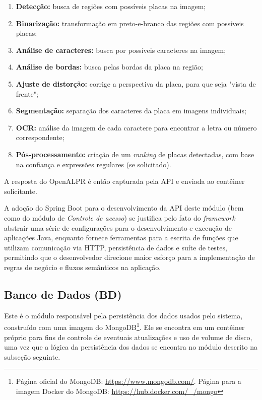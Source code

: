 \documentclass[12pt]{article}
\begin{document}
\begin{enumerate}
	\item \textbf{Detecção:} busca de regiões com possíveis placas na imagem;
	\item \textbf{Binarização:} transformação em preto-e-branco das regiões com possíveis placas;
	\item \textbf{Análise de caracteres:} busca por possíveis caracteres na imagem;
	\item \textbf{Análise de bordas:} busca pelas bordas da placa na região;
	\item \textbf{Ajuste de distorção:} corrige a perspectiva da placa, para que seja "vista de frente";
	\item \textbf{Segmentação:} separação dos caracteres da placa em imagens individuais;
	\item \textbf{OCR:} análise da imagem de cada caractere para encontrar a letra ou número correspondente;
	\item \textbf{Pós-processamento:} criação de um \textit{ranking} de placas detectadas, com base na confiança e expressões regulares (se solicitado).
\end{enumerate}

A resposta do OpenALPR é então capturada pela API e enviada ao contêiner solicitante.

A adoção do Spring Boot para o desenvolvimento da API deste módulo (bem como do módulo de \textit{Controle de acesso}) se justifica pelo fato do \textit{framework} abstrair uma série de configurações para o desenvolvimento e execução de aplicações Java, enquanto fornece ferramentas para a escrita de funções que utilizam comunicação via HTTP, persistência de dados e suíte de testes, permitindo que o desenvolvedor direcione maior esforço para a implementação de regras de negócio e fluxos semânticos na aplicação.

\subsection{Banco de Dados (BD)}

Este é o módulo responsável pela persistência dos dados usados pelo sistema, construído com uma imagem do MongoDB\footnote{Página oficial do MongoDB: \url{https://www.mongodb.com/}. Página para a imagem Docker do MongoDB: \url{https://hub.docker.com/_/mongo}}. Ele se encontra em um contêiner próprio para fins de controle de eventuais atualizações e uso de volume de disco, uma vez que a lógica da persistência dos dados se encontra no módulo descrito na subseção seguinte.
\end{document}
